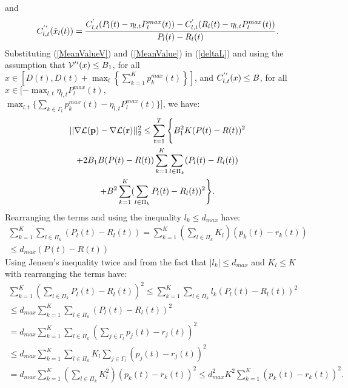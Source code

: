 \documentclass[12pt,draftcls,onecolumn]{IEEEtran}
\begin{document}
and
\begin{equation}
C_{l,t}^{\rq{}\rq{}}(\tilde{x}_{l}(t))=\frac{C_{l,t}^{\rq{}}(P_l(t)-\eta_{l,t}P_l^{max}(t))-C_{l,t}^{\rq{}}(R_l(t)-\eta_{l,t}P_l^{max}(t))}{P_l(t)-R_l(t)}.\\
\label{MeanValue}
\end{equation}
Substituting (\ref{MeanValueV}) and (\ref{MeanValue}) in (\ref{deltaL}) and using the assumption that $\mathcal{V}\rq{}\rq{}(x) \leq B_1$, for all $x \in [D(t), D(t)+\max_{t}\left\{\sum_{k=1}^{K}p_{k}^{max}(t)\right\}]$, and $C_{l,t}^{\rq{}\rq{}}(x) \leq B$, for all $x \in [-\max_{l,t}\eta_{l,t}P_{l}^{max}(t),$\\$ \max_{l,t}\{\sum_{k \in \Gamma_l}p_k^{max}(t)-\eta_{l,t}P_{l}^{max}(t)\}]$, we have:\\
\begin{gather}
||\nabla \mathcal{L}(\mathbf{p}) - \nabla \mathcal{L}(\mathbf{r})||_2^2 \leq \sum_{t=1}^{T}\Bigg{\{}B_{1}^{2}K(P(t)-R(t))^2 \nonumber \\
+2B_{1}B(P(t)-R(t)) \sum_{k=1}^{K}\sum_{l \in \Pi_k}(P_l(t)-R_l(t)) \nonumber \\
+B^2\sum_{k=1}^{K}(\sum_{l \in \Pi_k}P_l(t)-R_l(t))^2\Bigg{\}}.
\label{deltaL1}
\end{gather}
Rearranging the terms and using the inequality $l_k \leq d_{max}$ have:\\
\begin{gather}
\sum_{k=1}^{K}\sum_{l \in \Pi_k}\left(P_l(t)-R_l(t)\right)=\sum_{k=1}^{K}(\sum_{l \in \Pi_k}K_l)(p_k(t)-r_k(t)) \nonumber \\
\leq d_{max}(P(t)-R(t))
\label{Rearrange1}
\end{gather}
Using Jensen\rq{}s inequality twice and from the fact that $|l_k| \leq d_{max}$ and $K_l \leq K$ with rearranging the terms have:\\
\begin{gather}
\sum_{k=1}^{K}(\sum_{l \in \Pi_k}P_l(t)-R_l(t))^2 \leq \sum_{k=1}^{K}\sum_{l \in \Pi_k} l_{k}(P_l(t)-R_l(t))^2 \nonumber \\
\leq d_{max} \sum_{k=1}^{K}\sum_{l \in \Pi_k}(P_l(t)-R_l(t))^2 \nonumber \\
= d_{max} \sum_{k=1}^{K}\sum_{l \in \Pi_k}(\sum_{j \in \Gamma_l}p_j(t)-r_j(t))^2 \nonumber \\
\leq d_{max} \sum_{k=1}^{K}\sum_{l \in \Pi_k} K_l \sum_{j \in \Gamma_l}(p_j(t)-r_j(t))^2 \nonumber \\
= d_{max} \sum_{k=1}^{K}(\sum_{l \in \Pi_k}K_l^2)(p_k(t)-r_k(t))^2 \leq d_{max}^2K^2\sum_{k=1}^{K}(p_k(t)-r_k(t))^2.
\label{Rearrange2}
\end{gather}
\end{document}
